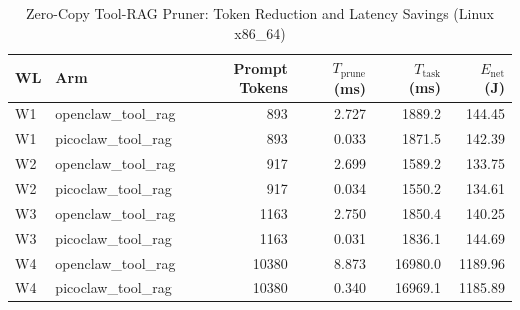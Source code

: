 \begin{table}[t]
\centering\small
\caption{Zero-Copy Tool-RAG Pruner: Token Reduction and Latency Savings (Linux x86_64)}
\label{tab:linux_tool_rag}
\begin{tabular}{llrrrr}
\toprule
WL & Arm & Prompt Tokens & $T_{\text{prune}}$ (ms) & $T_{\text{task}}$ (ms) & $E_{\text{net}}$ (J) \\
\midrule
W1 & openclaw\_tool\_rag & 893 & 2.727 & 1889.2 & 144.45 \\
W1 & picoclaw\_tool\_rag & 893 & 0.033 & 1871.5 & 142.39 \\
W2 & openclaw\_tool\_rag & 917 & 2.699 & 1589.2 & 133.75 \\
W2 & picoclaw\_tool\_rag & 917 & 0.034 & 1550.2 & 134.61 \\
W3 & openclaw\_tool\_rag & 1163 & 2.750 & 1850.4 & 140.25 \\
W3 & picoclaw\_tool\_rag & 1163 & 0.031 & 1836.1 & 144.69 \\
W4 & openclaw\_tool\_rag & 10380 & 8.873 & 16980.0 & 1189.96 \\
W4 & picoclaw\_tool\_rag & 10380 & 0.340 & 16969.1 & 1185.89 \\
\bottomrule
\end{tabular}
\end{table}
